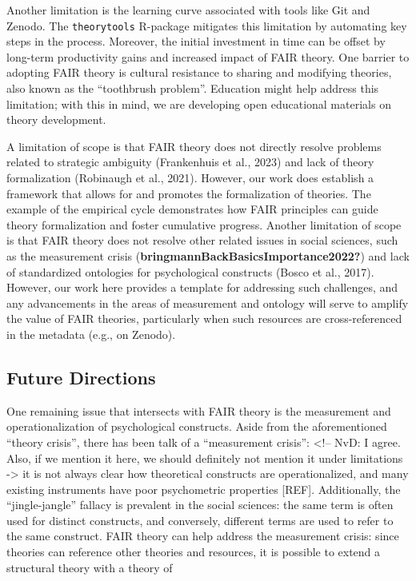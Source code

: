 \documentclass[
  man,floatsintext]{apa6}
\begin{document}
Another limitation is the learning curve associated with tools like Git and Zenodo.
The \texttt{theorytools} R-package mitigates this limitation by automating key steps in the process.
Moreover, the initial investment in time can be offset by long-term productivity gains and increased impact of FAIR theory.
One barrier to adopting FAIR theory is cultural resistance to sharing and modifying theories, also known as the ``toothbrush problem''.
Education might help address this limitation; with this in mind,
we are developing open educational materials on theory development.

A limitation of scope is that FAIR theory does not directly resolve problems related to strategic ambiguity (Frankenhuis et al., 2023) and lack of theory formalization (Robinaugh et al., 2021).
However, our work does establish a framework that allows for and promotes the formalization of theories.
The example of the empirical cycle demonstrates how FAIR principles can guide theory formalization and foster cumulative progress.
Another limitation of scope is that FAIR theory does not resolve other related issues in social sciences, such as the measurement crisis (\textbf{bringmannBackBasicsImportance2022?}) and lack of standardized ontologies for psychological constructs (Bosco et al., 2017).
However, our work here provides a template for addressing such challenges,
and any advancements in the areas of measurement and ontology will serve to amplify the value of FAIR theories, particularly when such resources are cross-referenced in the metadata (e.g., on Zenodo).

\subsection{Future Directions}\label{future-directions}

One remaining issue that intersects with FAIR theory is the measurement and operationalization of psychological constructs.
Aside from the aforementioned ``theory crisis'', there has been talk of a ``measurement crisis'': \textless!-- NvD: I agree. Also, if we mention it here, we should definitely not mention it under limitations -\textgreater{}
it is not always clear how theoretical constructs are operationalized, and many existing instruments have poor psychometric properties {[}REF{]}.
Additionally, the ``jingle-jangle'' fallacy is prevalent in the social sciences:
the same term is often used for distinct constructs, and conversely, different terms are used to refer to the same construct.
FAIR theory can help address the measurement crisis:
since theories can reference other theories and resources, it is possible to extend a structural theory with a theory of
\end{document}
